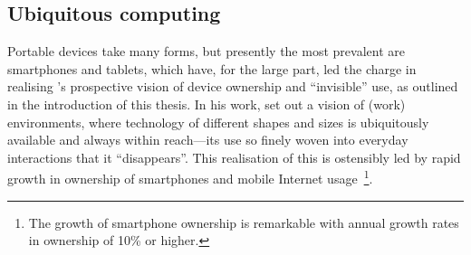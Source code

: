 


\subsection{Ubiquitous computing}\label{sec:background litreview society utopia}
Portable devices take many forms, but presently the most prevalent are smartphones and tablets, which have, for the large part, led the charge in realising \citet{Weiser1991}'s prospective vision of device ownership and ``invisible'' use, as outlined in the introduction of this thesis.
In his work, \citet{Weiser1991} set out a vision of (work) environments, where technology of different shapes and sizes is ubiquitously available and always within reach---its use so finely woven into everyday interactions that it ``disappears''.
This realisation of this is ostensibly led by rapid growth in ownership of smartphones and mobile Internet usage~\citep{Poushter2016}\footnote{The growth of smartphone ownership is remarkable with annual growth rates in ownership of 10\% or higher.}.

